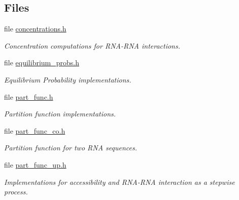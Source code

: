 \subsection*{Files}
\begin{DoxyCompactItemize}
\item 
file \mbox{\hyperlink{concentrations_8h}{concentrations.\+h}}
\begin{DoxyCompactList}\small\item\em Concentration computations for R\+N\+A-\/\+R\+NA interactions. \end{DoxyCompactList}\item 
file \mbox{\hyperlink{equilibrium__probs_8h}{equilibrium\+\_\+probs.\+h}}
\begin{DoxyCompactList}\small\item\em Equilibrium Probability implementations. \end{DoxyCompactList}\item 
file \mbox{\hyperlink{part__func_8h}{part\+\_\+func.\+h}}
\begin{DoxyCompactList}\small\item\em Partition function implementations. \end{DoxyCompactList}\item 
file \mbox{\hyperlink{part__func__co_8h}{part\+\_\+func\+\_\+co.\+h}}
\begin{DoxyCompactList}\small\item\em Partition function for two R\+NA sequences. \end{DoxyCompactList}\item 
file \mbox{\hyperlink{part__func__up_8h}{part\+\_\+func\+\_\+up.\+h}}
\begin{DoxyCompactList}\small\item\em Implementations for accessibility and R\+N\+A-\/\+R\+NA interaction as a stepwise process. \end{DoxyCompactList}\end{DoxyCompactItemize}
